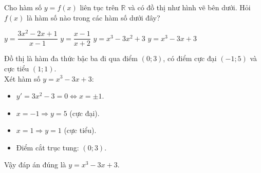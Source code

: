 \begin{ex}
Cho hàm số $y = f(x)$ liên tục trên $\mathbb{R}$ và có đồ thị như hình vẽ bên dưới. Hỏi $f(x)$ là hàm số nào trong các hàm số dưới đây?
\begin{center}
\end{center}
\choice
{$y = \dfrac{3x^2-2x+1}{x-1}$}
{$y = \dfrac{x-1}{x+2}$}
{$y = x^3 - 3x^2 + 3$}
{\True $y = x^3 - 3x + 3$}
\begin{loigiai}
Đồ thị là hàm đa thức bậc ba đi qua điểm $(0; 3)$, có điểm cực đại $(-1; 5)$ và cực tiểu $(1; 1)$.\\
Xét hàm số $y = x^3 - 3x + 3$:
\begin{itemize}
    \item $y' = 3x^2 - 3 = 0 \Leftrightarrow x = \pm 1$.
    \item $x = -1 \Rightarrow y = 5$ (cực đại).
    \item $x = 1 \Rightarrow y = 1$ (cực tiểu).
    \item Điểm cắt trục tung: $(0; 3)$.
\end{itemize}
Vậy đáp án đúng là $y = x^3 - 3x + 3$.
\end{loigiai}
\end{ex}

